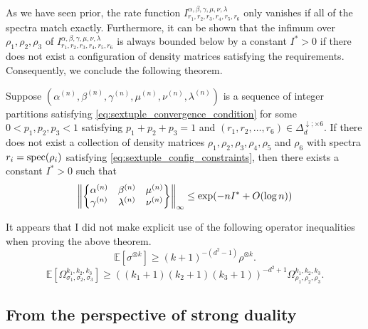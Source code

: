 \documentclass[notitlepage]{article}
\begin{document}
As we have seen prior, the rate function $I_{r_1, r_2, r_3, r_4, r_5, r_6}^{\alpha, \beta, \gamma, \mu, \nu, \lambda}$ only vanishes if all of the spectra match exactly.
Furthermore, it can be shown that the infimum over $\rho_1, \rho_2, \rho_3$ of $I_{r_1, r_2, r_3, r_4, r_5, r_6}^{\alpha, \beta, \gamma, \mu, \nu, \lambda}$ is always bounded below by a constant $I^{*} > 0$ if there does not exist a configuration of density matrices satisfying the requirements.
Consequently, we conclude the following theorem.
\begin{thm}
    Suppose $(\alpha^{(n)}, \beta^{(n)}, \gamma^{(n)}, \mu^{(n)}, \nu^{(n)}, \lambda^{(n)})$ is a sequence of integer partitions satisfying \cref{eq:sextuple_convergence_condition} for some $0 < p_1, p_2, p_3 < 1$ satisfying $p_1 + p_2 + p_3 = 1$ and $(r_1, r_2, \ldots, r_6) \in \Delta_{d}^{\downarrow; \times 6}$.
    If there does not exist a collection of density matrices $\rho_1, \rho_2, \rho_3, \rho_4, \rho_5$ and $\rho_6$ with spectra $r_i = \operatorname{spec}(\rho_i)$ satisfying \cref{eq:sextuple_config_constraints}, then there exists a constant $I^{*} > 0$ such that
    \begin{equation}
        \label{eq:sequential_recoupling_norm_upper_bound}
        \left\lVert\begin{Bmatrix} \alpha^{(n)} & \beta^{(n)} & \mu^{(n)} \\ \gamma^{(n)} & \lambda^{(n)} & \nu^{(n)} \end{Bmatrix}\right\rVert_{\infty}
        \leq \exp(-n I^{*} + O(\log n))
    \end{equation}
\end{thm}

\begin{rem}
    It appears that I did not make explicit use of the following operator inequalities when proving the above theorem.
    \begin{equation}
        \mathbb E\left[ \sigma^{\otimes k} \right] \geq (k+1)^{-(d^2-1)} \rho^{\otimes k}.
    \end{equation}
    \begin{equation}
        \mathbb E\left[\Omega_{\sigma_1,\sigma_2,\sigma_3}^{k_1, k_2, k_3}\right] \geq \left((k_1+1)(k_2+1)(k_3+1)\right)^{-d^2+1}\Omega_{\rho_1,\rho_2,\rho_3}^{k_1, k_2, k_3}.
    \end{equation}
\end{rem}

\subsection{From the perspective of strong duality}
\end{document}
